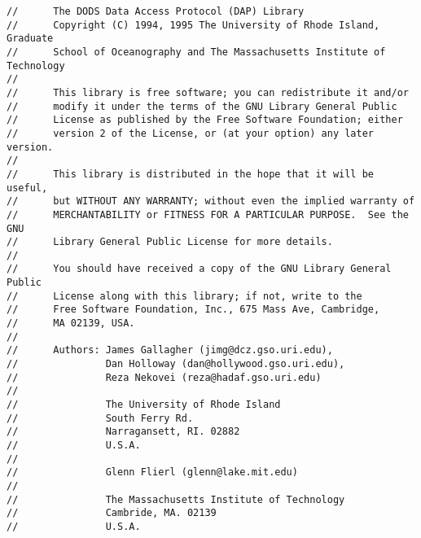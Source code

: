 \begin{verbatim}
//      The DODS Data Access Protocol (DAP) Library
//      Copyright (C) 1994, 1995 The University of Rhode Island, Graduate
//      School of Oceanography and The Massachusetts Institute of Technology
//     
//      This library is free software; you can redistribute it and/or
//      modify it under the terms of the GNU Library General Public
//      License as published by the Free Software Foundation; either
//      version 2 of the License, or (at your option) any later version.
//     
//      This library is distributed in the hope that it will be useful,
//      but WITHOUT ANY WARRANTY; without even the implied warranty of
//      MERCHANTABILITY or FITNESS FOR A PARTICULAR PURPOSE.  See the GNU
//      Library General Public License for more details.
//     
//      You should have received a copy of the GNU Library General Public
//      License along with this library; if not, write to the
//      Free Software Foundation, Inc., 675 Mass Ave, Cambridge,
//      MA 02139, USA.
//
//      Authors: James Gallagher (jimg@dcz.gso.uri.edu), 
//               Dan Holloway (dan@hollywood.gso.uri.edu), 
//               Reza Nekovei (reza@hadaf.gso.uri.edu)
//
//               The University of Rhode Island
//               South Ferry Rd.
//               Narragansett, RI. 02882
//               U.S.A.
//
//               Glenn Flierl (glenn@lake.mit.edu)
//
//               The Massachusetts Institute of Technology
//               Cambride, MA. 02139
//               U.S.A.
\end{verbatim}

